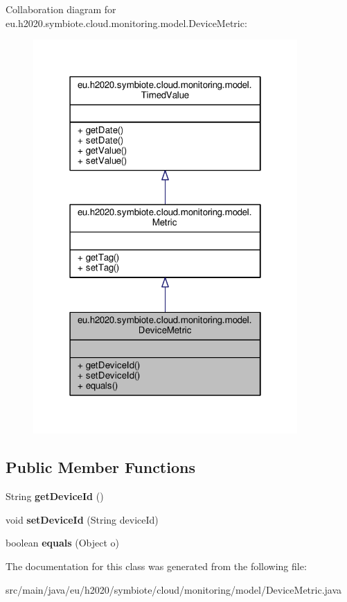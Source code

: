 Collaboration diagram for eu.\+h2020.\+symbiote.\+cloud.\+monitoring.\+model.\+Device\+Metric\+:
\nopagebreak
\begin{figure}[H]
\begin{center}
\leavevmode
\includegraphics[width=286pt]{classeu_1_1h2020_1_1symbiote_1_1cloud_1_1monitoring_1_1model_1_1DeviceMetric__coll__graph}
\end{center}
\end{figure}
\subsection*{Public Member Functions}
\begin{DoxyCompactItemize}
\item 
\mbox{\label{classeu_1_1h2020_1_1symbiote_1_1cloud_1_1monitoring_1_1model_1_1DeviceMetric_a3837f81730f0f73e24012f3755080e21}} 
String {\bfseries get\+Device\+Id} ()
\item 
\mbox{\label{classeu_1_1h2020_1_1symbiote_1_1cloud_1_1monitoring_1_1model_1_1DeviceMetric_ab309ce6c905d6c372857386983b5a025}} 
void {\bfseries set\+Device\+Id} (String device\+Id)
\item 
\mbox{\label{classeu_1_1h2020_1_1symbiote_1_1cloud_1_1monitoring_1_1model_1_1DeviceMetric_a450a1568d87b9c5b12a04935fab4bb44}} 
boolean {\bfseries equals} (Object o)
\end{DoxyCompactItemize}


The documentation for this class was generated from the following file\+:\begin{DoxyCompactItemize}
\item 
src/main/java/eu/h2020/symbiote/cloud/monitoring/model/Device\+Metric.\+java\end{DoxyCompactItemize}
